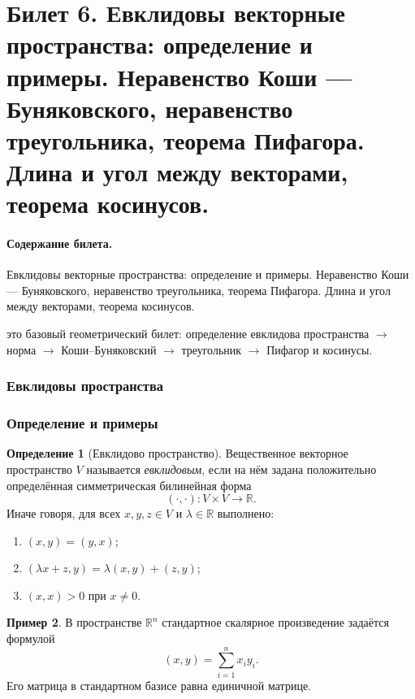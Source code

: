 \documentclass[12pt,a4paper]{article}
\theoremstyle{definition}
\newtheorem{definition}{Определение}[section]
\newtheorem{example}[definition]{Пример}
\theoremstyle{plain}
\theoremstyle{remark}
\newenvironment{planadd}{\begin{planbox}}{\end{planbox}}
\newcommand{\R}{\mathbb{R}}
\begin{document}
\clearpage

\section{Билет 6. Евклидовы векторные пространства: определение и примеры. Неравенство Коши — Буняковского, неравенство треугольника, теорема Пифагора. Длина и угол между векторами, теорема косинусов.}

\paragraph{Содержание билета.} Евклидовы векторные пространства: определение и примеры. Неравенство Коши — Буняковского, неравенство треугольника, теорема Пифагора. Длина и угол между векторами, теорема косинусов.

\begin{planadd}

это базовый геометрический билет: определение евклидова пространства $\to$ норма $\to$ Коши--Буняковский $\to$ треугольник $\to$ Пифагор и косинусы.

\end{planadd}

\subsubsection{Евклидовы пространства}

\subsubsection*{Определение и примеры}

\begin{definition}[Евклидово пространство]
Вещественное векторное пространство $V$ называется \emph{евклидовым}, если на нём задана положительно определённая симметрическая билинейная форма
\[
    (\cdot,\cdot):V\times V\to\R.
\]
Иначе говоря, для всех $x,y,z\in V$ и $\lambda\in\R$ выполнено:
\begin{enumerate}[label=\arabic*)]
    \item $(x,y)=(y,x)$;
    \item $(\lambda x+z,y)=\lambda(x,y)+(z,y)$;
    \item $(x,x)>0$ при $x\ne0$.
\end{enumerate}
\end{definition}

\begin{example}
В пространстве $\R^n$ стандартное скалярное произведение задаётся формулой
\[
    (x,y)=\sum_{i=1}^n x_i y_i.
\]
Его матрица в стандартном базисе равна единичной матрице.
\end{example}
\end{document}
